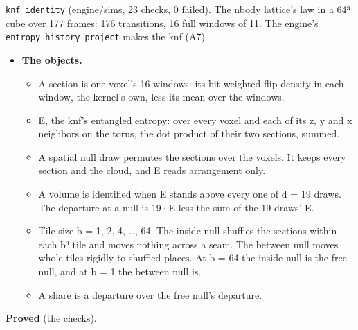 \texttt{knf\_\allowbreak{}identity} (engine/sims, 23 checks, 0 failed). The nbody lattice's law in a 64³ cube over 177 frames: 176 transitions, 16 full windows of 11. The engine's \texttt{entropy\_\allowbreak{}history\_\allowbreak{}project} makes the knf (A7).

\begin{itemize}
\item \textbf{The objects.}

\begin{itemize}
\item A section is one voxel's 16 windows: its bit-weighted flip density in each window, the kernel's own, less its mean over the windows.
\item E, the knf's entangled entropy: over every voxel and each of its z, y and x neighbors on the torus, the dot product of their two sections, summed.
\item A spatial null draw permutes the sections over the voxels. It keeps every section and the cloud, and E reads arrangement only.
\item A volume is identified when E stands above every one of d = 19 draws. The departure at a null is 19·E less the sum of the 19 draws' E.
\item Tile size b = 1, 2, 4, …, 64. The inside null shuffles the sections within each b³ tile and moves nothing across a seam. The between null moves whole tiles rigidly to shuffled places. At b = 64 the inside null is the free null, and at b = 1 the between null is.
\item A share is a departure over the free null's departure.
\end{itemize}
\end{itemize}

\textbf{Proved} (the checks).

